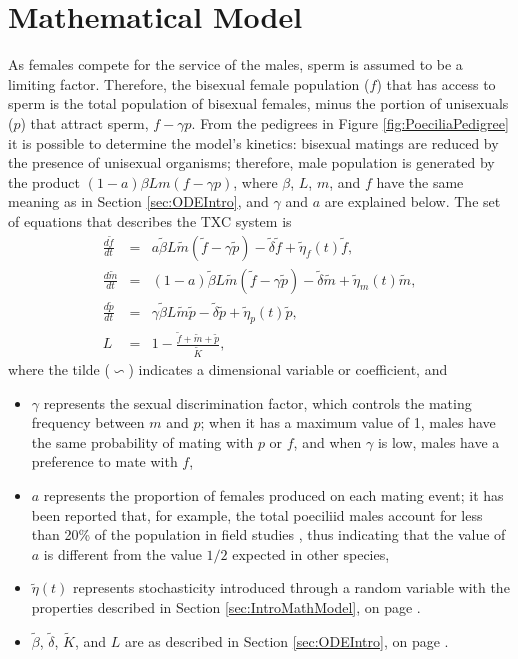 	\section{Mathematical Model}\label{sec:PoeciliaMath}	
	As females compete for the service of the males, sperm is assumed to be a limiting factor. Therefore, the bisexual female population ($f$) that has access to sperm is the total population of bisexual females, minus the portion of unisexuals ($p$) that attract sperm, $f-\gamma p$. From the pedigrees in Figure \ref{fig:PoeciliaPedigree} it is possible to determine the model's kinetics: bisexual matings are reduced by the presence of unisexual organisms; therefore, male population is generated by the product $(1-a)\beta L m (f-\gamma p)$, where $\beta$,  $L$,  $m$, and $f$ have the same meaning as in Section \ref{sec:ODEIntro}, and $\gamma$ and $a$ are explained below. The set of equations that describes the TXC system is
	\begin{eqnarray}
		\frac{d\tilde{f}}{dt} &=& a\tilde{\beta}L\tilde{m}(\tilde{f}-\gamma \tilde{p})-\tilde{\delta}\tilde{f}+\tilde{\eta}_f(t)\tilde{f} \label{eq:PoecFDim}, \\
		\frac{d\tilde{m}}{dt} &=&(1-a)\tilde{\beta}L\tilde{m}(\tilde{f}-\gamma \tilde{p})-\tilde{\delta}\tilde{m}+\tilde{\eta}_m(t)\tilde{m} \label{eq:PoecMDim}, \\
		\frac{d\tilde{p}}{dt} &=& \gamma\tilde{\beta}L\tilde{m} \tilde{p} -\tilde{\delta}\tilde{p} + \tilde{\eta}_p(t) \tilde{p} \nonumber,\\ 
		L & = &  1-\frac{\tilde{f}+\tilde{m}+\tilde{p}}{\tilde{K}}\nonumber, 
	\end{eqnarray}
	where the tilde ($\backsim$) indicates a dimensional variable or coefficient, and
	\begin{itemize}
		\item $\gamma $ represents the sexual discrimination factor, which controls the mating frequency between $m$ and $p$; when it has a maximum value of 1, males have the same probability of mating with $p$ or $f$, and when $\gamma$ is low, males have a preference to mate with $f$,
		\item $a$ represents the proportion of females produced on each mating event; it has been reported that, for example, the total poeciliid males account for less than 20\% of the population in field studies \cite{Balsano:Poecilia, Snelson:ratio}, thus indicating that the value of $a$ is different from the value $1/2$ expected in other species,
		\item $\tilde{\eta}(t)$ represents stochasticity introduced through a random variable with the properties described in Section \ref{sec:IntroMathModel}, on page \pageref{eq:GeneralEq}. 
		\item $\tilde{\beta}$, $\tilde{\delta}$, $\tilde{K}$, and $L$ are as described in Section \ref{sec:ODEIntro}, on page \pageref{item:Variables}.
	\end{itemize}


